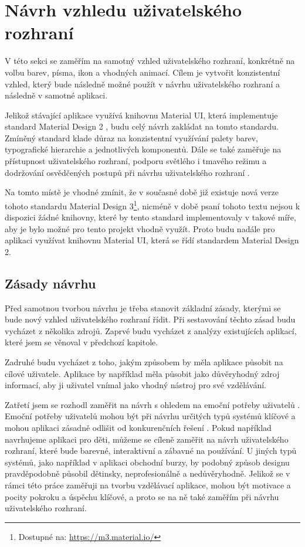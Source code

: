 \section{Návrh vzhledu uživatelského rozhraní}

V této sekci se zaměřím na samotný vzhled uživatelského rozhraní, konkrétně na volbu barev, písma, ikon a vhodných animací. Cílem je vytvořit konzistentní vzhled, který bude následně možné použít v návrhu uživatelského rozhraní a následně v samotné aplikaci.

Jelikož stávající aplikace využívá knihovnu Material UI, která implementuje standard Material Design 2 \cite{MaterialUI}, budu celý návrh zakládat na tomto standardu. Zmíněný standard klade důraz na konzistentní využívání palety barev, typografické hierarchie a jednotlivých komponentů. Dále se také zaměřuje na přístupnost uživatelského rozhraní, podporu světlého i tmavého režimu a dodržování osvědčených postupů při návrhu uživatelského rozhraní \cite{MaterialDesign2}.

Na tomto místě je vhodné zmínit, že v současné době již existuje nová verze tohoto standardu Material Design 3\footnote{Dostupné na: \href{https://m3.material.io/}{https://m3.material.io/}}, nicméně v době psaní tohoto textu nejsou k dispozici žádné knihovny, které by tento standard implementovaly v takové míře, aby je bylo možné pro tento projekt vhodně využít. Proto budu nadále pro aplikaci využívat knihovnu Material UI, která se řídí standardem Material Design 2.

\subsection{Zásady návrhu}

Před samotnou tvorbou návrhu je třeba stanovit základní zásady, kterými se bude nový vzhled uživatelského rozhraní řídit. Při sestavování těchto zásad budu vycházet z několika zdrojů. Zaprvé budu vycházet z analýzy existujících aplikací, které jsem se věnoval v předchozí kapitole.

Zadruhé budu vycházet z toho, jakým způsobem by měla aplikace působit na cílové uživatele. Aplikace by například měla působit jako důvěryhodný zdroj informací, aby ji uživatel vnímal jako vhodný nástroj pro své vzdělávání.

Zatřetí jsem se rozhodl zaměřit na návrh s ohledem na emoční potřeby uživatelů \cite[385]{Hartson2019TheUxBook}. Emoční potřeby uživatelů mohou být při návrhu určitých typů systémů klíčové a mohou aplikaci zásadně odlišit od konkurenčních řešení \cite[387]{Hartson2019TheUxBook}. Pokud například navrhujeme aplikaci pro děti, můžeme se cíleně zaměřit na návrh uživatelského rozhraní, které bude barevné, interaktivní a zábavné na používání. U jiných typů systémů, jako například v aplikaci obchodní burzy, by podobný způsob designu pravděpodobně působil dětinsky, neprofesionálně a nedůvěryhodně. Jelikož se v rámci této práce zaměřuji na tvorbu vzdělávací aplikace, mohou být motivace a pocity pokroku a úspěchu klíčové, a proto se na ně také zaměřím při návrhu uživatelského rozhraní.

